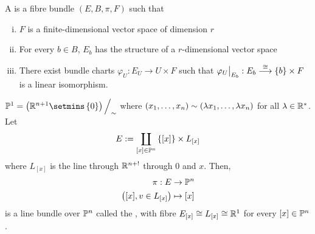 \documentclass[main.tex]{subfiles}
\begin{document}
 A  is a fibre bundle $(E, B, \pi, F)$ such that
\begin{enumerate}[(i)]
    \item $F$ is a finite-dimensional vector space of dimension $r$
    \item For every $b \in B$, $E_b$ has the structure of a $r$-dimensional vector space
    \item There exist bundle charts $\varphi_U : E_U \to U \times F$ such that $\varphi_U\big|_{E_b} : E_b \overset{\cong}{\longrightarrow} \left\{b\right\} \times F$ is a linear isomorphism.
\end{enumerate}

\begin{exmp}
 $\mathbb{P}^1 = \br{\R^{n+1} \setmins \brc{0}} \Big/_\sim$ where $\left( x_1, \dots, x_n \right) \sim \left( \lambda x_1, \dots, \lambda x_n \right)$ for all $\lambda \in \mathbb{R}^*$. Let 
\[
E := \coprod_{[x] \in \mathbb{P}^n} \left\{[x]\right\} \times L_{[x]}
\] where $L_[x]$ is the line through $\mathbb{R}^{n+!}$ through $0$ and $x$.
Then,
\begin{align*}
    \pi: E &\to \mathbb{P}^n \\
        \left( [x], v \in L_{[x]}  \right) &\mapsto [x]
\end{align*}
is a line bundle over $\mathbb{P}^n$ called the , with fibre $E_{[x]} \cong L_{[x]} \cong \mathbb{R}^1$ for every $[x] \in \mathbb{P}^n$.


\end{exmp}
\end{document}
